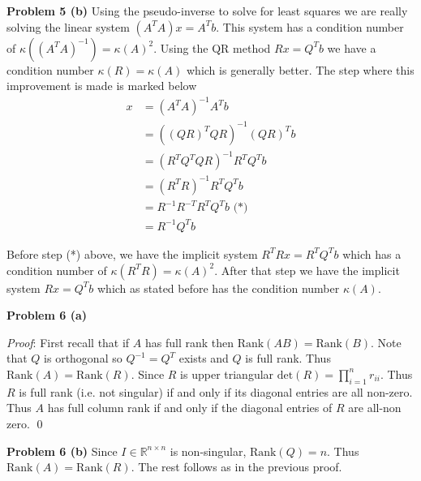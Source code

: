 \documentclass[12pt]{article}
\newcommand{\problem}[1]{\hspace{-4 ex} \large \textbf{Problem #1} }
\renewenvironment{proof}{\hspace{-4 ex} \emph{Proof}:}{\qed}
\newcommand{\RR}{\mathbb{R}}
\begin{document}

\bigbreak
\problem{5 (b)} Using the pseudo-inverse to solve for least squares we are really solving the linear system $(A^TA)x=A^Tb$. This system has a condition number of $\kappa((A^TA)^{-1}) = \kappa(A)^2$. Using the QR method $Rx = Q^Tb$ we have a condition number $\kappa(R) = \kappa(A)$ which is generally better. The step where this improvement is made is marked below
\begin{align*}
	x & = (A^TA)^{-1}A^Tb \\
	& = ((QR)^TQR)^{-1}(QR)^Tb \\
	& = (R^TQ^TQR)^{-1}R^TQ^Tb \\
	& = (R^TR)^{-1}R^TQ^Tb \\
	& = R^{-1}R^{-T}R^TQ^Tb \text{\ \ \ \ \ \ (*)} \\
	& = R^{-1}Q^Tb
\end{align*}

Before step (*) above, we have the implicit system $R^TRx = R^TQ^Tb$ which has a condition number of $\kappa{(R^TR)} = \kappa(A)^2$. After that step we have the implicit system $Rx = Q^Tb$ which as stated before has the condition number $\kappa(A)$.

\bigbreak
\problem{6 (a)} 

\begin{proof} First recall that if $A$ has full rank then $\text{Rank}(AB) = \text{Rank}(B)$. \bigbreak
	Note that $Q$ is orthogonal so $Q^{-1} = Q^T$ exists and $Q$ is full rank. Thus $\text{Rank}(A) = \text{Rank}(R)$. Since $R$ is upper triangular $\text{det}(R) = \prod\limits_{i=1}^n r_{ii}$. Thus $R$ is full rank (i.e. not singular) if and only if its diagonal entries are all non-zero. Thus $A$ has full column rank if and only if the diagonal entries of $R$ are all-non zero.
\end{proof}

\bigbreak
\problem{6 (b)} Since $I \in \RR^{n\times n}$ is non-singular, $\text{Rank}(Q) = n$. Thus $\text{Rank}(A) = \text{Rank}(R)$. The rest follows as in the previous proof.
\end{document}
